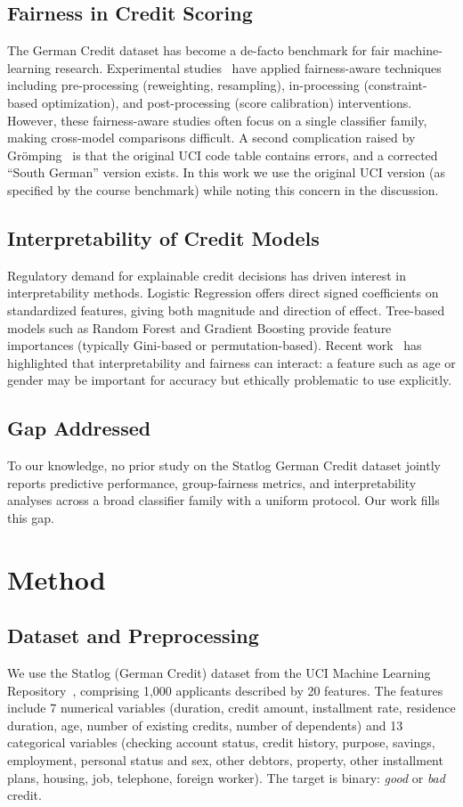 \documentclass[conference]{IEEEtran}
\begin{document}
\subsection{Fairness in Credit Scoring}
The German Credit dataset has become a de-facto benchmark for fair machine-learning research. Experimental studies~\cite{fairness_aware_2024,brio_2024} have applied fairness-aware techniques including pre-processing (reweighting, resampling), in-processing (constraint-based optimization), and post-processing (score calibration) interventions. However, these fairness-aware studies often focus on a single classifier family, making cross-model comparisons difficult. A second complication raised by Gr\"omping~\cite{groemping_south_german} is that the original UCI code table contains errors, and a corrected ``South German'' version exists. In this work we use the original UCI version (as specified by the course benchmark) while noting this concern in the discussion.

\subsection{Interpretability of Credit Models}
Regulatory demand for explainable credit decisions has driven interest in interpretability methods. Logistic Regression offers direct signed coefficients on standardized features, giving both magnitude and direction of effect. Tree-based models such as Random Forest and Gradient Boosting provide feature importances (typically Gini-based or permutation-based). Recent work~\cite{fairness_datasets_storysofar} has highlighted that interpretability and fairness can interact: a feature such as age or gender may be important for accuracy but ethically problematic to use explicitly.

\subsection{Gap Addressed}
To our knowledge, no prior study on the Statlog German Credit dataset jointly reports predictive performance, group-fairness metrics, and interpretability analyses across a broad classifier family with a uniform protocol. Our work fills this gap.

\section{Method}\label{sec:method}

\subsection{Dataset and Preprocessing}
We use the Statlog (German Credit) dataset from the UCI Machine Learning Repository~\cite{hofmann1994german}, comprising 1{,}000 applicants described by 20 features. The features include 7 numerical variables (duration, credit amount, installment rate, residence duration, age, number of existing credits, number of dependents) and 13 categorical variables (checking account status, credit history, purpose, savings, employment, personal status and sex, other debtors, property, other installment plans, housing, job, telephone, foreign worker). The target is binary: \emph{good} or \emph{bad} credit.
\end{document}
